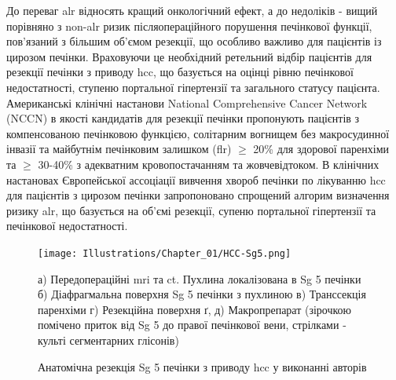 До переваг \acrshort{alr} відносять кращий онкологічний ефект, а до недоліків - вищий порівняно з \acrshort{non-alr} ризик післяопераційного порушення печінкової функції, пов'язаний з більшим об'ємом резекції, що особливо важливо для пацієнтів із цирозом печінки. Враховуючи це необхідний ретельний відбір пацієнтів для резекції печінки з приводу \acrshort{hcc}, що базується на оцінці рівню печінкової недостатності, ступеню портальної гіпертензії та загального статусу пацієнта. Американські клінічні настанови National Comprehensive Cancer Network (\acrshort{NCCN}) в якості кандидатів для резекції печінки пропонують пацієнтів з компенсованою печінковою функцією, солітарним вогнищем без макросудинної інвазії та майбутнім печінковим залишком (\acrshort{flr}) $\geq$ 20\% для здорової паренхіми та $\geq$ 30-40\% з адекватним кровопостачанням та жовчевідтоком. В клінічних настановах Європейської ассоціації вивчення хвороб печінки по лікуванню \acrshort{hcc} \cite{Galle2018a} для пацієнтів з цирозом печінки запропоновано спрощений алгорим визначення ризику \acrshort{alr}, що базується на об'ємі резекції, супеню портальної гіпертензії та печінкової недостатності. 


\begin{figure}[h]
\caption{Анатомічна резекція Sg 5 печінки з приводу \acrshort{hcc} у виконанні авторів}

\texttt{[image: Illustrations/Chapter\_01/HCC-Sg5.png]}
\label{fig:HCC-Sg5}

\medskip
\small
а) Передопераційні \acrshort{mri} та \acrshort{ct}. Пухлина локалізована в Sg 5 печінки б) Діафрагмальна поверхня Sg 5 печінки з пухлиною  в) Транссекція паренхіми г) Резекційна поверхня ґ, д) Макропрепарат (зірочкою помічено приток від Sg 5 до правої печінкової вени, стрілками - культі сегментарних глісонів)

\end{figure}



